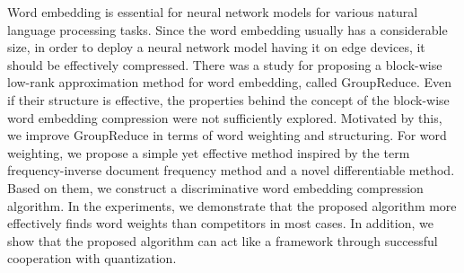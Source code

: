 Word embedding is essential for neural network models for various natural language processing tasks. Since the word embedding usually has a considerable size, in order to deploy a neural network model having it on edge devices, it should be effectively compressed. There was a study for proposing a block-wise low-rank approximation method for word embedding, called GroupReduce. Even if their structure is effective, the properties behind the concept of the block-wise word embedding compression were not sufficiently explored. Motivated by this, we improve GroupReduce in terms of word weighting and structuring. For word weighting, we propose a simple yet effective method inspired by the term frequency-inverse document frequency method and a novel differentiable method. Based on them, we construct a discriminative word embedding compression algorithm. In the experiments, we demonstrate that the proposed algorithm more effectively finds word weights than competitors in most cases. In addition, we show that the proposed algorithm can act like a framework through successful cooperation with quantization.
